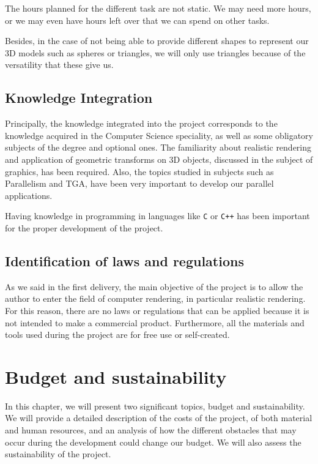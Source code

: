 \documentclass[titlepage,12pt]{report}
\begin{document}
The hours planned for the different task are not static. We may need more hours, or we may even have hours left over that we can spend on other tasks.

Besides, in the case of not being able to provide different shapes to represent our 3D models such as spheres or triangles, we will only use triangles because of the versatility that these give us.

\section{Knowledge Integration}

Principally, the knowledge integrated into the project corresponds to the knowledge acquired in the Computer Science speciality, as well as some obligatory subjects of the degree and optional ones. The familiarity about realistic rendering and application of geometric transforms on 3D objects, discussed in the subject of graphics, has been required. Also, the topics studied in subjects such as Parallelism and TGA, have been very important to develop our parallel applications.

Having knowledge in programming in languages like \texttt{C} or \texttt{C++} has been important for the proper development of the project.

\section{Identification of laws and regulations}

As we said in the first delivery, the main objective of the project is to allow the author to enter the field of computer rendering, in particular realistic rendering. For this reason, there are no laws or regulations that can be applied because it is not intended to make a commercial product. Furthermore, all the materials and tools used during the project are for free use or self-created.

\chapter{Budget and sustainability}

In this chapter, we will present two significant topics, budget and sustainability. We will provide a detailed description of the costs of the project, of both material and human resources, and an analysis of how the different obstacles that may occur during the development could change our budget. We will also assess the sustainability of the project.
\end{document}

